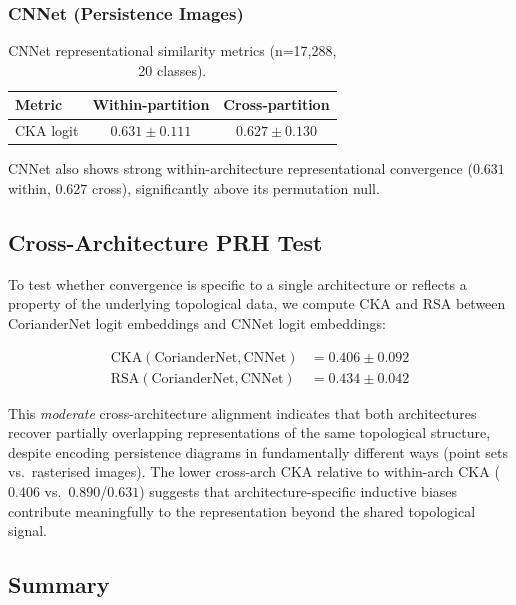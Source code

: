 \subsubsection{CNNet (Persistence Images)}

\begin{table}[h]
\centering
\begin{tabular}{lcc}
\hline
Metric & Within-partition & Cross-partition \\
\hline
CKA logit & $0.631 \pm 0.111$ & $0.627 \pm 0.130$ \\
\hline
\end{tabular}
\caption{CNNet representational similarity metrics (n=17,288, 20 classes).}
\end{table}

CNNet also shows strong within-architecture representational convergence
($0.631$ within, $0.627$ cross), significantly above its permutation null.

\subsection{Cross-Architecture PRH Test}

To test whether convergence is specific to a single architecture or reflects
a property of the underlying topological data, we compute CKA and RSA between
CorianderNet logit embeddings and CNNet logit embeddings:

\begin{align}
\text{CKA}(\text{CorianderNet}, \text{CNNet}) &= 0.406 \pm 0.092 \\
\text{RSA}(\text{CorianderNet}, \text{CNNet}) &= 0.434 \pm 0.042
\end{align}

This \emph{moderate} cross-architecture alignment indicates that both
architectures recover partially overlapping representations of the same
topological structure, despite encoding persistence diagrams in fundamentally
different ways (point sets vs.\ rasterised images).  The lower cross-arch
CKA relative to within-arch CKA ($0.406$ vs.\ $0.890$/$0.631$) suggests that
architecture-specific inductive biases contribute meaningfully to the
representation beyond the shared topological signal.

\subsection{Summary}

